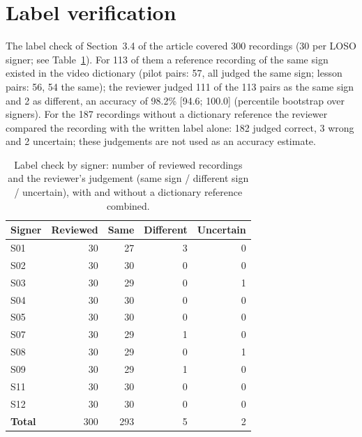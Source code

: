 \documentclass[a4paper,10pt]{article}
\begin{document}
\section{Label verification}
The label check of Section~3.4 of the article covered 300 recordings (30 per LOSO signer; see Table~\ref{tab:s_lab}). For 113 of them a reference recording of the same sign existed in the video dictionary (pilot pairs: 57, all judged the same sign; lesson pairs: 56, 54 the same); the reviewer judged 111 of the 113 pairs as the same sign and 2 as different, an accuracy of 98.2\% [94.6; 100.0] (percentile bootstrap over signers). For the 187 recordings without a dictionary reference the reviewer compared the recording with the written label alone: 182 judged correct, 3 wrong and 2 uncertain; these judgements are not used as an accuracy estimate.
\begin{table}[H]
\caption{Label check by signer: number of reviewed recordings and the reviewer's judgement (same sign / different sign / uncertain), with and without a dictionary reference combined.}\label{tab:s_lab}
\centering
\footnotesize
\begin{tabular}{lrrrr}
\toprule
\textbf{Signer} & \textbf{Reviewed} & \textbf{Same} & \textbf{Different} & \textbf{Uncertain} \\
\midrule
S01 & 30 & 27 & 3 & 0 \\
S02 & 30 & 30 & 0 & 0 \\
S03 & 30 & 29 & 0 & 1 \\
S04 & 30 & 30 & 0 & 0 \\
S05 & 30 & 30 & 0 & 0 \\
S07 & 30 & 29 & 1 & 0 \\
S08 & 30 & 29 & 0 & 1 \\
S09 & 30 & 29 & 1 & 0 \\
S11 & 30 & 30 & 0 & 0 \\
S12 & 30 & 30 & 0 & 0 \\
\textbf{Total} & 300 & 293 & 5 & 2 \\
\bottomrule
\end{tabular}
\end{table}
\end{document}
